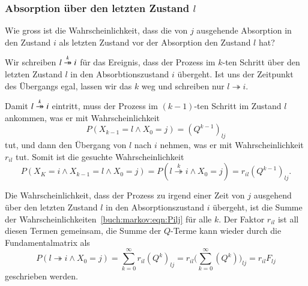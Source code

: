 \subsubsection{Absorption über den letzten Zustand $l$}
\begin{frage}
Wie gross ist die Wahrscheinlichkeit, dass die von $j$ ausgehende
Absorption in den Zustand $i$ als letzten Zustand vor der Absorption
den Zustand $l$ hat?
\end{frage}
Wir schreiben $l\overset{\smash{k}}{\twoheadrightarrow} i$ für das Ereignis, dass der Prozess
im $k$-ten Schritt über den letzten
Zustand $l$ in den Absorbtionszustand $i$ übergeht.
Ist uns der Zeitpunkt des Übergangs egal, lassen wir das $k$
weg und schreiben nur $l\twoheadrightarrow i$.

Damit $l\overset{\smash{k}}{\twoheadrightarrow} i$ eintritt, muss der Prozess im $(k-1)$-ten Schritt im
Zustand $l$ ankommen, was er mit Wahrscheinlichkeit
\[
P(X_{k-1}=l\wedge X_0=j) = (Q^{k-1})_{l\!j}
\]
tut, und dann den Übergang von $l$ nach $i$ nehmen, was er mit
Wahrscheinlichkeit $r_{il}$ tut.
Somit ist die gesuchte Wahrscheinlichkeit
\begin{equation}
P(X_K=i\wedge X_{k-1}=l\wedge X_0=j)
=
P(l\overset{k}{\twoheadrightarrow} i\wedge X_0=j)
=
r_{il}(Q^{k-1})_{l\!j}.
\label{buch:markov:eqn:Pilj}
\end{equation}

Die Wahrscheinlichkeit, dass der Prozess zu irgend einer Zeit von $j$
ausgehend über den letzten Zustand $l$ in den Absorptionszustand $i$
übergeht, ist die Summe der Wahrscheinlichkeiten~\eqref{buch:markov:eqn:Pilj}
für alle $k$.
Der Faktor $r_{il}$ ist all diesen Termen gemeinsam, die Summe der
$Q$-Terme kann wieder durch die Fundamentalmatrix als
\[
P(l\twoheadrightarrow i\wedge X_0 = j)
=
\sum_{k=0}^\infty r_{il}(Q^k)_{l\!j}
=
r_{il}\biggl(\sum_{k=0}^\infty (Q^k)\biggr)_{l\!j}
=
r_{il}F_{l\!j}
\]
geschrieben werden.

